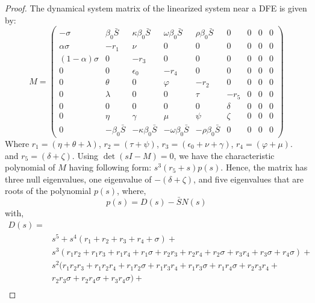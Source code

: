 \documentclass[fleqn,10pt]{wlscirep}
\begin{document}
\begin{proof}
The dynamical system matrix of the linearized system near a DFE is given by:
\begin{equation}
M = 
\begin{pmatrix}
-\sigma & \beta_0 \bar{S}& \kappa \beta_0 \bar{S}& \omega \beta_0 \bar{S}& \rho \beta_0 \bar{S}& 0 &0 & 0 &0 \\
\alpha \sigma & -r_1  & \nu & 0 & 0 & 0 &0 & 0 &0 \\
\left( 1- \alpha \right) \sigma & 0 & -r_3 & 0 & 0 & 0 &0 & 0 &0 \\
0 & 0 & \epsilon_0 & -r_4  & 0 & 0 &0 & 0 &0 \\
0 & \theta & 0 & \varphi & -r_2  & 0 &0 & 0 &0 \\
0 & \lambda & 0 & 0 & \tau & -r_5 &0 & 0 &0 \\
0 & 0 & 0 & 0 & 0 & \delta &0 & 0 &0 \\
0 & \eta & \gamma & \mu & \psi & \zeta &0 & 0 &0 \\
0 & -\beta_0 \bar{S}& -\kappa \beta_0 \bar{S}& -\omega \beta_0 \bar{S}& -\rho \beta_0 \bar{S}& 0 &0 & 0 &0
\end{pmatrix}
\end{equation}
Where $r_1 = \left( \eta + \theta + \lambda \right) $, $r_2 = \left( \tau + \psi \right) $, $r_3 = \left( \epsilon_0 + \nu + \gamma\right) $, $r_4 =  \left( \varphi + \mu\right)$. and $r_5=\left( \delta + \zeta\right)$. Using $\det(sI-M) = 0$, we have the characteristic polynomial of $M$ having following form:  $s^{3} \left(r_{5} + s\right) p(s)$. Hence, the matrix has three null eigenvalues, one eigenvalue of $-\left( \delta + \zeta\right)$, and five eigenvalues that are roots of the polynomial $p(s)$, where,
\begin{equation}
p(s) = D(s) - \bar{S}N(s)
\end{equation}
%
with, 
\begin{equation}
\begin{split}
D(s) = \\
& s^{5} + s^{4} \left(r_{1} + r_{2} + r_{3} + r_{4} + \sigma\right) + \\
& s^{3} \left(r_{1} r_{2} + r_{1} r_{3} + r_{1} r_{4} + r_{1} \sigma + r_{2} r_{3} + r_{2} r_{4} + r_{2} \sigma + r_{3} r_{4} + r_{3} \sigma + r_{4} \sigma\right) + \\
& s^{2} (r_{1} r_{2} r_{3} + r_{1} r_{2} r_{4} + r_{1} r_{2} \sigma + r_{1} r_{3} r_{4} + r_{1} r_{3} \sigma + r_{1} r_{4} \sigma + r_{2} r_{3} r_{4} +\\
& r_{2} r_{3} \sigma + r_{2} r_{4} \sigma + r_{3} r_{4} \sigma) + \\ 

\end{split}
\end{equation}
\end{proof}
\end{document}
